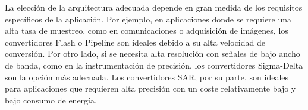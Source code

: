 La elección de la arquitectura adecuada depende en gran medida de los requisitos específicos de la aplicación. Por ejemplo, en aplicaciones donde se requiere una alta tasa de muestreo, como en comunicaciones o adquisición de imágenes, los convertidores Flash o Pipeline son ideales debido a su alta velocidad de conversión. Por otro lado, si se necesita alta resolución con señales de bajo ancho de banda, como en la instrumentación de precisión, los convertidores Sigma-Delta son la opción más adecuada. Los convertidores SAR, por su parte, son ideales para aplicaciones que requieren alta precisión con un coste relativamente bajo y bajo consumo de energía.


